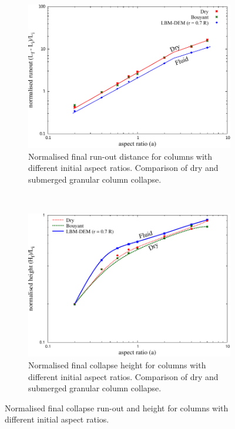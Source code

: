 \begin{figure}
	\centering
\begin{subfigure}[t]{0.9\textwidth}
	\centering
	\includegraphics[width=\textwidth]{runoutf}
	\caption{Normalised final run-out distance for columns with different 
	initial aspect ratios. Comparison of dry and submerged granular column 
	collapse.}
	\label{fig:runoutf}
\end{subfigure}\\
\begin{subfigure}[t]{0.9\textwidth}
	\centering
	\includegraphics[width=\textwidth]{Heightf}
	\caption{Normalised final collapse height for columns with different 
	initial aspect ratios. Comparison of dry and submerged granular column 
	collapse.}
	\label{fig:heightf}
\end{subfigure}
	\caption{Normalised final collapse run-out and height for columns with 
	different initial aspect ratios.}
	\label{fig:height_runout_fluid}
\end{figure}


